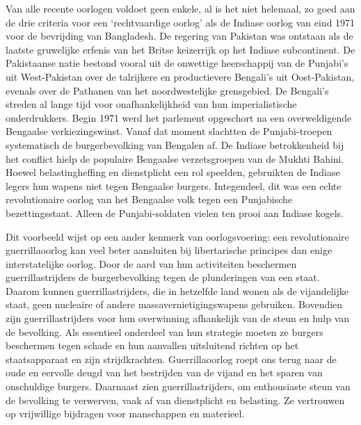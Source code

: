 \documentclass[
  a5paper,
  smalldemyvopaper,10pt,twoside,onecolumn,openright,extrafontsizes,hidelinks]{memoir}
\begin{document}
Van alle recente oorlogen voldoet geen enkele, al is het niet helemaal,
zo goed aan de drie criteria voor een `rechtvaardige oorlog' als de
Indiase oorlog van eind 1971 voor de bevrijding van Bangladesh. De
regering van Pakistan was ontstaan als de laatste gruwelijke erfenis van
het Britse keizerrijk op het Indiase subcontinent. De Pakistaanse natie
bestond vooral uit de onwettige heerschappij van de Punjabi's uit
West-Pakistan over de talrijkere en productievere Bengali's uit
Oost-Pakistan, evenals over de Pathanen van het noordwestelijke
grensgebied. De Bengali's streden al lange tijd voor onafhankelijkheid
van hun imperialistische onderdrukkers. Begin 1971 werd het parlement
opgeschort na een overweldigende Bengaalse verkiezingswinst. Vanaf dat
moment slachtten de Punjabi-troepen systematisch de burgerbevolking van
Bengalen af. De Indiase betrokkenheid bij het conflict hielp de
populaire Bengaalse verzetsgroepen van de Mukhti Bahini. Hoewel
belastingheffing en dienstplicht een rol speelden, gebruikten de Indiase
legers hun wapens niet tegen Bengaalse burgers. Integendeel, dit was een
echte revolutionaire oorlog van het Bengaalse volk tegen een Punjabische
bezettingsstaat. Alleen de Punjabi-soldaten vielen ten prooi aan Indiase
kogels.

Dit voorbeeld wijst op een ander kenmerk van oorlogsvoering: een
revolutionaire guerrillaoorlog kan veel beter aansluiten bij
libertarische principes dan enige interstatelijke oorlog. Door de aard
van hun activiteiten beschermen guerrillastrijders de burgerbevolking
tegen de plunderingen van een staat. Daarom kunnen guerrillastrijders,
die in hetzelfde land wonen als de vijandelijke staat, geen nucleaire of
andere massavernietigingswapens gebruiken. Bovendien zijn
guerrillastrijders voor hun overwinning afhankelijk van de steun en hulp
van de bevolking. Als essentieel onderdeel van hun strategie moeten ze
burgers beschermen tegen schade en hun aanvallen uitsluitend richten op
het staatsapparaat en zijn strijdkrachten. Guerrillaoorlog roept ons
terug naar de oude en eervolle deugd van het bestrijden van de vijand en
het sparen van onschuldige burgers. Daarnaast zien guerrillastrijders,
om enthousiaste steun van de bevolking te verwerven, vaak af van
dienstplicht en belasting. Ze vertrouwen op vrijwillige bijdragen voor
manschappen en materieel.
\end{document}
